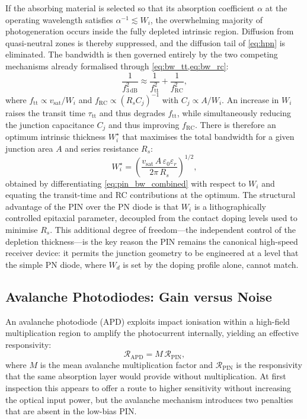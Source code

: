 If the absorbing material is selected so that its absorption coefficient
$\alpha$ at the operating wavelength satisfies $\alpha^{-1}\lesssim W_i$,
the overwhelming majority of photogeneration occurs inside the fully depleted
intrinsic region. Diffusion from quasi-neutral zones is thereby suppressed,
and the diffusion tail of \cref{eq:hpn} is eliminated. The bandwidth is
then governed entirely by the two competing mechanisms already formalised
through \cref{eq:bw_tt,eq:bw_rc}:
\begin{equation}
    \frac{1}{f_{3\,\mathrm{dB}}^2} \approx
    \frac{1}{f_{\mathrm{tt}}^2} + \frac{1}{f_{\mathrm{RC}}^2},
    \label{eq:pin_bw_combined}
\end{equation}
where $f_{\mathrm{tt}} \propto v_{\mathrm{sat}}/W_i$ and
$f_{\mathrm{RC}} \propto (R_s C_j)^{-1}$ with $C_j \propto A/W_i$. An
increase in $W_i$ raises the transit time $\tau_{\mathrm{tt}}$ and thus
degrades $f_{\mathrm{tt}}$, while simultaneously reducing the junction
capacitance $C_j$ and thus improving $f_{\mathrm{RC}}$. There is therefore
an optimum intrinsic thickness $W_i^{\star}$ that maximises the total
bandwidth for a given junction area $A$ and series resistance $R_s$:
\begin{equation}
    W_i^{\star} = \left(\frac{v_{\mathrm{sat}}\,A\,\varepsilon_0\varepsilon_r}
    {2\pi\,R_s}\right)^{1/2},
    \label{eq:pin_opt_wi}
\end{equation}
obtained by differentiating \cref{eq:pin_bw_combined} with respect to $W_i$
and equating the transit-time and RC contributions at the optimum. The
structural advantage of the PIN over the PN diode is that $W_i$ is a
lithographically controlled epitaxial parameter, decoupled from the contact
doping levels used to minimise $R_s$. This additional degree of freedom---the
independent control of the depletion thickness---is the key reason the PIN
remains the canonical high-speed receiver device: it permits the junction
geometry to be engineered at a level that the simple PN diode, where $W_d$
is set by the doping profile alone, cannot match.

\subsection[Avalanche Photodiodes]{Avalanche Photodiodes: Gain versus Noise}
\label{subsec:pd_apd}

An avalanche photodiode (APD) exploits impact ionisation within a high-field
multiplication region to amplify the photocurrent internally, yielding an
effective responsivity:
\begin{equation}
    \mathcal{R}_{\mathrm{APD}} = M\,\mathcal{R}_{\mathrm{PIN}},
    \label{eq:r_apd}
\end{equation}
where $M$ is the mean avalanche multiplication factor and
$\mathcal{R}_{\mathrm{PIN}}$ is the responsivity that the same absorption
layer would provide without multiplication. At first inspection this appears
to offer a route to higher sensitivity without increasing the optical input
power, but the avalanche mechanism introduces two penalties that are absent
in the low-bias PIN.

